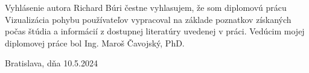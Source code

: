 \newpage





\null
\vfill
\begin{center}
\begin{minipage}{1\textwidth} %
{\fontsize{22}{1.3}\selectfont Vyhlásenie autora} \newline
Richard Búri čestne vyhlasujem, že som diplomovú prácu Vizualizácia pohybu používateľov vypracoval na základe poznatkov získaných počas štúdia a informácií z dostupnej literatúry uvedenej v práci.
Vedúcim mojej diplomovej práce bol Ing. Maroš Čavojský, PhD.

\vspace{1cm}

Bratislava, dňa 10.5.2024

\end{minipage}
\end{center}
\vfill
\null




\pagebreak
